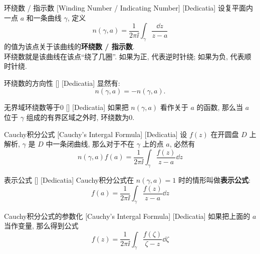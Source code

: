\documentclass[UTF8]{ctexart}
\begin{document}
        \begin{dfn}
            [WindingNumber]
            {环绕数 / 指示数}
            [Winding Number / Indicating Number]
            [Dedicatia]
            设复平面内一点 \(a\) 和一条曲线 \(\gamma\), 定义
            \[n(\gamma, a)=\frac{1}{2\pi\ii}\int_\gamma\frac{\dd{z}}{z-a}\]
            的值为该点关于该曲线的\textbf{环绕数 / 指示数}.\\
            环绕数就是该曲线在该点“绕了几圈”. 如果为正, 代表逆时针绕; 如果为负, 代表顺时针绕. 
        \end{dfn}

        \begin{ppt}
            [UUID]
            {环绕数的方向性}
            []
            [Dedicatia]
            显然有: 
            \[n(\gamma,a)=-n(\gamma,a).\]
        \end{ppt}

        \begin{ppt}
            [UUID]
            {无界域环绕数等于0}
            []
            [Dedicatia]
            如果把 \(n(\gamma,a)\) 看作关于 \(a\) 的函数, 那么当 \(a\) 位于 \(\gamma\) 组成的有界区域之外时, 环绕数为0.
        \end{ppt}

        \begin{thm}
            [UUID]
            {Cauchy积分公式}
            [Cauchy's Intergal Formula]
            [Dedicatia]
            设 \(f(z)\) 在开圆盘 \(D\) 上解析,  \(\gamma\) 是 \(D\) 中一条闭曲线, 那么对于不在 \(\gamma\) 上的点 \(a\), 必然有
            \[n(\gamma,a)f(a)=\frac{1}{2\pi\ii}\int_\gamma\frac{f(z)}{z-a}\dd{z} \]
        \end{thm}

        \begin{crl}
            [CauchyRepresenting]
            {表示公式}
            []
            [Dedicatia]
            Cauchy积分公式在 \(n(\gamma,a)=1\) 时的情形叫做\textbf{表示公式}:
            \[f(a)=\frac{1}{2\pi\ii}\int_\gamma\frac{f(z)}{z-a}\dd{z}\]
        \end{crl}

        \begin{crl}
            [UUID]
            {Cauchy积分公式的参数化}
            [Cauchy's Intergal Formula]
            [Dedicatia]
            如果把上面的 \(a\) 当作变量, 那么得到公式
            \[f(z)=\frac{1}{2\pi\ii}\int_\gamma\frac{f(\zeta)}{\zeta-z}\dd{\zeta}\]
        \end{crl}
\end{document}
